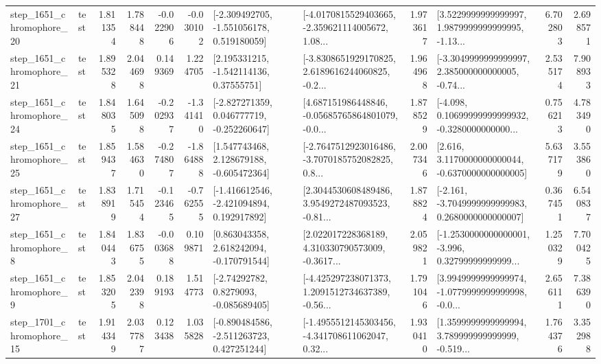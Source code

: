 \begin{tabular}{llrrrrllrlrr}
 step\_1651\_chromophore\_20 &      test &      1.811354 &    1.788448 &     -0.022906 & -0.030102 &   [-2.309492705, -1.551056178, 0.519180059] &  [-4.0170815529403665, -2.359621114005672, 1.08... &       1.973617 &  [3.5229999999999997, 1.9879999999999995, -1.13... &            6.702803 &          2.698571 \\
 step\_1651\_chromophore\_21 &      test &      1.895328 &    2.044698 &      0.149369 &  1.224705 &     [2.195331215, -1.542114136, 0.37555751] &  [-3.8308651929170825, 2.6189616244060825, -0.2... &       1.964968 &  [-3.3049999999999997, 2.385000000000005, -0.74... &            2.535174 &          7.908933 \\
 step\_1651\_chromophore\_24 &      test &      1.848035 &    1.645098 &     -0.202937 & -1.341410 &   [-2.827271359, 0.046777719, -0.252260647] &  [4.687151986448846, -0.05685765864801079, -0.0... &       1.878529 &  [-4.098, 0.10699999999999932, -0.3280000000000... &            0.756213 &          4.783490 \\
 step\_1651\_chromophore\_25 &      test &      1.859437 &    1.584630 &     -0.274807 & -1.864888 &    [1.547743468, 2.128679188, -0.605472364] &  [-2.7647512923016486, -3.7070185752082825, 0.8... &       2.007346 &   [2.616, 3.1170000000000044, -0.6370000000000005] &            5.637179 &          3.553860 \\
 step\_1651\_chromophore\_27 &      test &      1.838919 &    1.715454 &     -0.123465 & -0.762555 &   [-1.416612546, -2.421094894, 0.192917892] &  [2.3044530608489486, 3.9549272487093523, -0.81... &       1.878824 &  [-2.161, -3.7049999999999983, 0.2680000000000007] &            0.367451 &          6.540837 \\
  step\_1651\_chromophore\_8 &      test &      1.840443 &    1.836755 &     -0.003688 &  0.109871 &    [0.863043358, 2.618242094, -0.170791544] &  [2.022017228368189, 4.310330790573009, -0.3617... &       2.059821 &  [-1.2530000000000001, -3.996, 0.32799999999999... &            1.250329 &          7.700425 \\
  step\_1651\_chromophore\_9 &      test &      1.853205 &    2.042398 &      0.189193 &  1.514773 &      [-2.74292782, 0.8279093, -0.085689405] &  [-4.425297238071373, 1.2091512734637389, -0.56... &       1.791046 &  [3.9949999999999974, -1.0779999999999998, -0.0... &            2.656111 &          7.386390 \\
 step\_1701\_chromophore\_15 &      test &      1.914349 &    2.037787 &      0.123438 &  1.035828 &   [-0.890484586, -2.511263723, 0.427251244] &  [-1.4955512145303456, -4.341708611062047, 0.32... &       1.930410 &  [1.3599999999999994, 3.789999999999999, -0.519... &            1.764376 &          3.352988 \\

\end{tabular}
